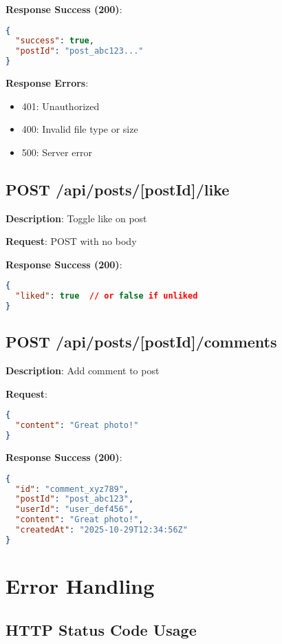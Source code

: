 \documentclass[12pt,a4paper]{report}
\begin{document}
\textbf{Response Success (200)}:
\begin{lstlisting}[language=json]
{
  "success": true,
  "postId": "post_abc123..."
}
\end{lstlisting}

\textbf{Response Errors}:
\begin{itemize}
    \item 401: Unauthorized
    \item 400: Invalid file type or size
    \item 500: Server error
\end{itemize}

\subsection{POST /api/posts/[postId]/like}

\textbf{Description}: Toggle like on post

\textbf{Request}: POST with no body

\textbf{Response Success (200)}:
\begin{lstlisting}[language=json]
{
  "liked": true  // or false if unliked
}
\end{lstlisting}

\subsection{POST /api/posts/[postId]/comments}

\textbf{Description}: Add comment to post

\textbf{Request}:
\begin{lstlisting}[language=json]
{
  "content": "Great photo!"
}
\end{lstlisting}

\textbf{Response Success (200)}:
\begin{lstlisting}[language=json]
{
  "id": "comment_xyz789",
  "postId": "post_abc123",
  "userId": "user_def456",
  "content": "Great photo!",
  "createdAt": "2025-10-29T12:34:56Z"
}
\end{lstlisting}

\section{Error Handling}

\subsection{HTTP Status Code Usage}
\end{document}
